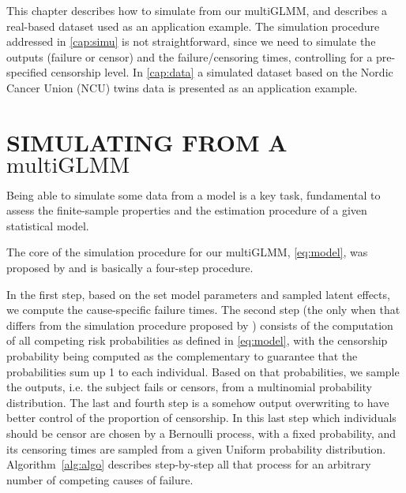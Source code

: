 This chapter describes how to simulate from our multiGLMM, and describes
a real-based dataset used as an application example. The simulation
procedure addressed in \autoref{cap:simu} is not straightforward, since
we need to simulate the outputs (failure or censor) and the
failure/censoring times, controlling for a pre-specified censorship
level. In \autoref{cap:data} a simulated dataset based on the Nordic
Cancer Union (NCU) twins data is presented as an application example.

\section{SIMULATING FROM A \(\text{multiGLMM}\)}
\label{cap:simu}

Being able to simulate some data from a model is a key task, fundamental
to assess the finite-sample properties and the estimation procedure of a
given statistical model.

The core of the simulation procedure for our multiGLMM,
\autoref{eq:model}, was proposed by  and is
basically a four-step procedure.

In the first step, based on the set model parameters and sampled latent
effects, we compute the cause-specific failure times. The second step
(the only when that differs from the simulation procedure proposed by
) consists of the computation of all competing risk
probabilities as defined in \autoref{eq:model}, with the censorship
probability being computed as the complementary to guarantee that the
probabilities sum up 1 to each individual. Based on that probabilities,
we sample the outputs, i.e. the subject fails or censors, from a
multinomial probability distribution. The last and fourth step is a
somehow output overwriting to have better control of the proportion of
censorship. In this last step which individuals should be censor are
chosen by a Bernoulli process, with a fixed probability, and its
censoring times are sampled from a given Uniform probability
distribution. Algorithm~\ref{alg:algo} describes step-by-step all that
process for an arbitrary number of competing causes of failure.

